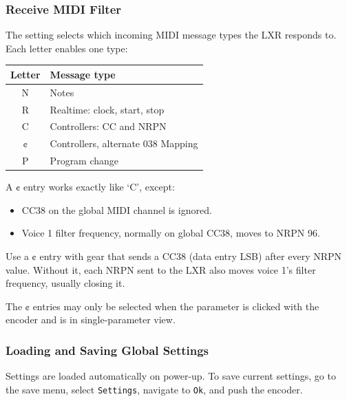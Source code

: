 \subsubsection{Receive MIDI Filter}\label{receive-midi-filter}

The  setting selects which incoming MIDI message types the
LXR responds to. Each letter enables one type:

{\def\LTcaptype{none} %
\begin{longtable}[]{@{}cl@{}}
\toprule\noalign{}
Letter & Message type \\
\midrule\noalign{}
\endhead
\bottomrule\noalign{}
\endlastfoot
N & Notes \\
R & Realtime: clock, start, stop \\
C & Controllers: CC and NRPN \\
¢ & Controllers, alternate 038 Mapping \\
P & Program change \\
\end{longtable}
}

A ¢ entry works exactly like `C', except:

\begin{itemize}
\tightlist
\item
  CC38 on the global MIDI channel is ignored.
\item
  Voice 1 filter frequency, normally on global CC38, moves to NRPN 96.
\end{itemize}

Use a ¢ entry with gear that sends a CC38 (data entry LSB) after every
NRPN value. Without it, each NRPN sent to the LXR also moves voice 1's
filter frequency, usually closing it.

The ¢ entries may only be selected when the parameter is clicked with
the encoder and is in single-parameter view.

\subsubsection{Loading and Saving Global
Settings}\label{loading-and-saving-global-settings}

Settings are loaded automatically on power-up. To save current settings,
go to the save menu, select \texttt{Settings}, navigate to \texttt{Ok},
and push the encoder.
